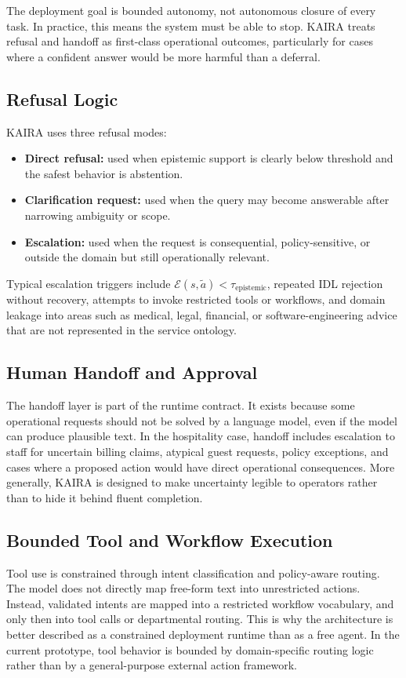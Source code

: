 \documentclass[11pt,a4paper]{article}
\begin{document}
The deployment goal is bounded autonomy, not autonomous closure of every task. In practice, this means the system must be able to stop. KAIRA treats refusal and handoff as first-class operational outcomes, particularly for cases where a confident answer would be more harmful than a deferral.

\subsection{Refusal Logic}
KAIRA uses three refusal modes:
\begin{itemize}
  \item \textbf{Direct refusal:} used when epistemic support is clearly below threshold and the safest behavior is abstention.
  \item \textbf{Clarification request:} used when the query may become answerable after narrowing ambiguity or scope.
  \item \textbf{Escalation:} used when the request is consequential, policy-sensitive, or outside the domain but still operationally relevant.
\end{itemize}
Typical escalation triggers include $\mathcal{E}(s,\tilde{a}) < \tau_{\text{epistemic}}$, repeated IDL rejection without recovery, attempts to invoke restricted tools or workflows, and domain leakage into areas such as medical, legal, financial, or software-engineering advice that are not represented in the service ontology.

\subsection{Human Handoff and Approval}
The handoff layer is part of the runtime contract. It exists because some operational requests should not be solved by a language model, even if the model can produce plausible text. In the hospitality case, handoff includes escalation to staff for uncertain billing claims, atypical guest requests, policy exceptions, and cases where a proposed action would have direct operational consequences. More generally, KAIRA is designed to make uncertainty legible to operators rather than to hide it behind fluent completion.

\subsection{Bounded Tool and Workflow Execution}
Tool use is constrained through intent classification and policy-aware routing. The model does not directly map free-form text into unrestricted actions. Instead, validated intents are mapped into a restricted workflow vocabulary, and only then into tool calls or departmental routing. This is why the architecture is better described as a constrained deployment runtime than as a free agent. In the current prototype, tool behavior is bounded by domain-specific routing logic rather than by a general-purpose external action framework.
\end{document}
